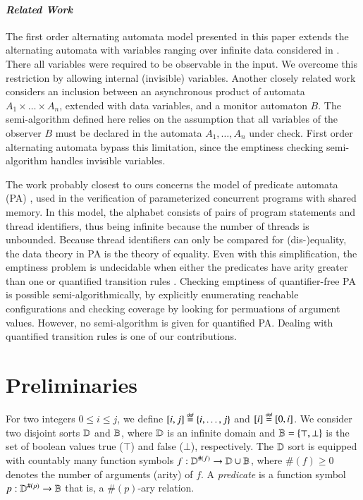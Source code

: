 \paragraph{\em Related Work} 
The first order alternating automata model presented in this paper
extends the alternating automata with variables ranging over infinite
data considered in \cite{IosifXu18}. There all variables were required
to be observable in the input. We overcome this restriction by
allowing internal (invisible) variables. Another closely related work
\cite{IosifRV16} considers an inclusion between an asynchronous
product of automata $A_1 \times \ldots \times A_n$, extended with data
variables, and a monitor automaton $B$. The semi-algorithm defined
here relies on the assumption that all variables of the observer $B$
must be declared in the automata $A_1, \ldots, A_n$ under check. First
order alternating automata bypass this limitation, since the emptiness
checking semi-algorithm handles invisible variables. 

The work probably closest to ours concerns the model of predicate
automata (PA) \cite{Farzan15,Farzan16,KincaidPhD}, used in the
verification of parameterized concurrent programs with shared
memory. In this model, the alphabet consists of pairs of program
statements and thread identifiers, thus being infinite because the
number of threads is unbounded. Because thread identifiers can only be
compared for (dis-)equality, the data theory in PA is the theory of
equality. Even with this simplification, the emptiness problem is
undecidable when either the predicates have arity greater than one
\cite{Farzan15} or quantified transition rules
\cite{KincaidPhD}. Checking emptiness of quantifier-free PA is
possible semi-algorithmically, by explicitly enumerating reachable
configurations and checking coverage by looking for permuations of
argument values. However, no semi-algorithm is given for quantified
PA.  Dealing with quantified transition rules is one of our
contributions.

\section{Preliminaries}

For two integers $0 \leq i \leq j$, we define $[i,j] \stackrel{\scriptscriptstyle{\mathsf{def}}}{=}
\{ i,\ldots,j \}$ and $[i] \stackrel{\scriptscriptstyle{\mathsf{def}}}{=} [0,i]$. We consider two disjoint
sorts $\mathbb{D}$ and $\mathbb{B}$, where $\mathbb{D}$ is an infinite domain and
$\mathbb{B} = \{ \top,\bot \}$ is the set of boolean values true ($\top$)
and false ($\bot$), respectively. The $\mathbb{D}$ sort is equipped with
countably many function symbols $f : \mathbb{D}^{\#(f)} \rightarrow \mathbb{D}
\cup \mathbb{B}$, where $\#(f)\geq0$ denotes the number of arguments
(arity) of $f$. A \emph{predicate} is a function symbol $p :
\mathbb{D}^{\#(p)} \rightarrow \mathbb{B}$ that is, a $\#(p)$-ary relation.

